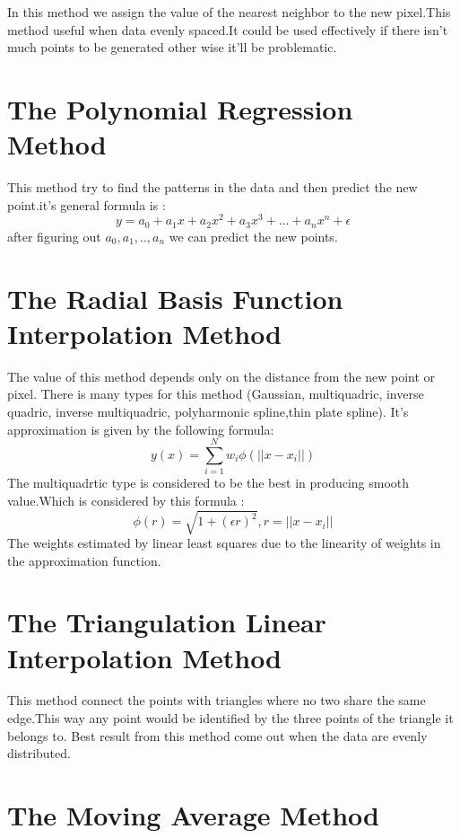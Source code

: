 \documentclass{article}
\begin{document}
\begin{multicols*}{2}
\begin{flushleft}
In this method we assign the value of the nearest neighbor to the new pixel.This method useful when data evenly spaced.It could be used effectively if there isn't much points to be generated other wise it'll be problematic.\cite{1}
\end{flushleft}
{\centering	\section{The Polynomial Regression Method}}
\begin{flushleft}
This method try to find the patterns in the data and then predict the new point.it's general formula is :
\[y=a_0+a_1x+a_2x^2+a_3x^3+...+a_nx^n+\epsilon\]
after figuring out \(a_0,a_1,..,a_n\) we can predict the new points.
\end{flushleft}
{\centering	\section{The Radial Basis Function Interpolation Method}}
\begin{flushleft}
The value of this method depends only on the distance from the new point or pixel.\cite{7} There is many types for this method (Gaussian, multiquadric, inverse quadric, inverse multiquadric, polyharmonic spline,thin plate spline). It's approximation is given by the following formula: \[y(x) = \sum_{i=1}^{N}w_i\phi(||x-x_i||)\]
The multiquadrtic type is considered to be the best \cite{1} in producing smooth value.Which is considered by this formula :
\[\phi(r)=\sqrt{1+(\epsilon r)^2},r=||x-x_i||\]
The weights estimated by linear least squares due to the linearity of weights in the approximation function.\cite{7}
\end{flushleft}
{\centering	\section{The Triangulation Linear Interpolation Method}}
\begin{flushleft}
This method connect the points with triangles where no two share the same edge.This way any point would be identified by the three points of the triangle it belongs to. Best result from this method come out when the data are evenly distributed.\cite{1}
\end{flushleft}
{\centering	\section{The Moving Average Method}}

\end{multicols*}
\end{document}
